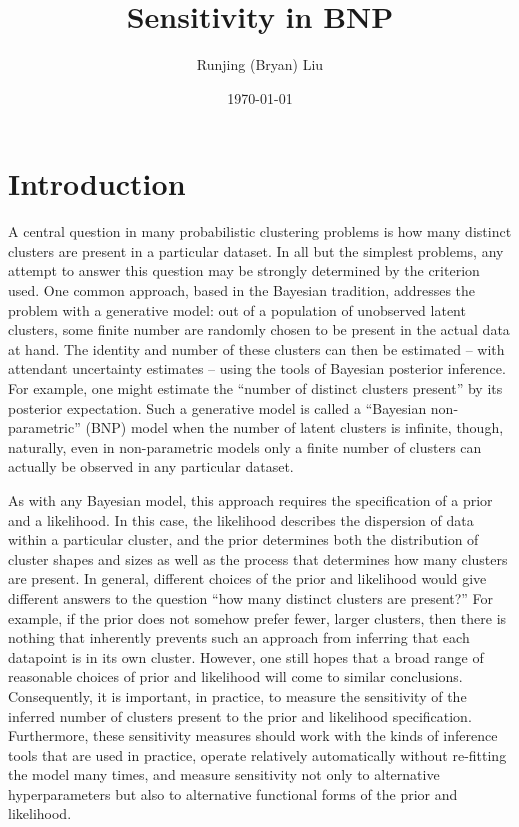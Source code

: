 \documentclass[a4paper]{article}
\title{Sensitivity in BNP}
\author{Runjing (Bryan) Liu}
\date{\today}
\begin{document}
\maketitle
\tableofcontents
\newpage

\section{Introduction}
A central question in many probabilistic clustering problems is how many distinct
clusters are present in a particular dataset. In all but the simplest problems,
any attempt to answer this question may be strongly determined by the criterion
used. One common approach, based in the Bayesian tradition, addresses the problem
with a generative model: out of a population of unobserved latent clusters,
some finite number are randomly chosen to be present in the actual data at hand.
The identity and number of these clusters can then be estimated – with attendant
uncertainty estimates – using the tools of Bayesian posterior inference.
For example, one might estimate the “number of distinct clusters present” by its
posterior expectation.
Such a generative model is called a “Bayesian non-parametric” (BNP) model when
the number of latent clusters is infinite, though, naturally, even in
non-parametric models only a finite number of clusters can actually be
observed in any particular dataset.

As with any Bayesian model, this approach requires the specification of a prior
and a likelihood. In this case, the likelihood describes the dispersion of data
within a particular cluster, and the prior determines both the distribution of
cluster shapes and sizes as well as the process that determines how many clusters
are present. In general, different choices of the prior and likelihood would
give different answers to the question “how many distinct clusters are present?”
For example, if the prior does not somehow prefer fewer, larger clusters, then
there is nothing that inherently prevents such an approach from inferring that
each datapoint is in its own cluster. However, one still hopes that a broad range
of reasonable choices of prior and likelihood will come to similar conclusions.
Consequently, it is important, in practice, to measure the sensitivity of the
inferred number of clusters present to the prior and likelihood specification.
Furthermore, these sensitivity measures should work with the kinds of inference
tools that are used in practice, operate relatively automatically without
re-fitting the model many times, and measure sensitivity not only to alternative
hyperparameters but also to alternative functional forms of the prior and likelihood.
\end{document}
